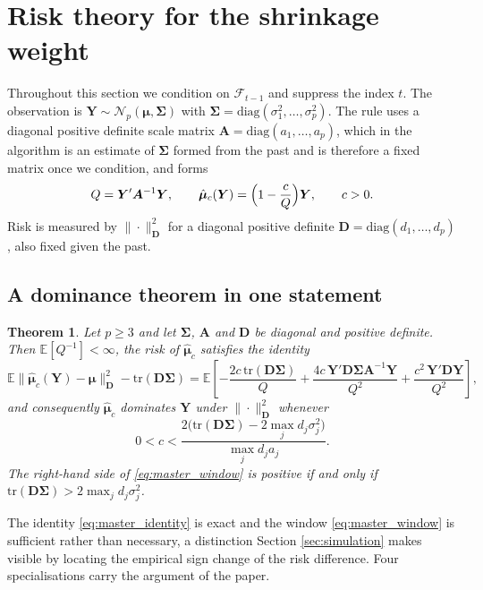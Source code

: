 \documentclass[pdflatex,sn-mathphys-num]{sn-jnl}%
\theoremstyle{thmstyleone}%
\newtheorem{theorem}{Theorem}%
\theoremstyle{thmstyletwo}%
\theoremstyle{thmstylethree}%
\newcommand{\tr}{\mathrm{tr}}
\newcommand{\diag}{\mathrm{diag}}
\newcommand{\E}{\mathbb{E}}
\begin{document}
\section{Risk theory for the shrinkage weight}
\label{sec:risk}

Throughout this section we condition on $\mathcal F_{t-1}$ and suppress the index $t$. The observation is $\bm Y\sim\mathcal N_p(\bm\mu,\bm\Sigma)$ with $\bm\Sigma=\diag(\sigma^2_1,\dots,\sigma^2_p)$. The rule uses a diagonal positive definite scale matrix $\bm A=\diag(a_1,\dots,a_p)$, which in the algorithm is an estimate of $\bm\Sigma$ formed from the past and is therefore a fixed matrix once we condition, and forms
\begin{equation}
\label{eq:Q_and_delta}
Q=\bm Y'\bm A^{-1}\bm Y,
\qquad
\hat{\bm\mu}_c(\bm Y)=\Bigl(1-\frac{c}{Q}\Bigr)\bm Y ,
\qquad c>0 .
\end{equation}
Risk is measured by $\|\cdot\|^2_{\bm D}$ for a diagonal positive definite $\bm D=\diag(d_1,\dots,d_p)$, also fixed given the past.

\subsection{A dominance theorem in one statement}

\begin{theorem}
\label{thm:master}
Let $p\ge3$ and let $\bm\Sigma$, $\bm A$ and $\bm D$ be diagonal and positive definite. Then $\E[Q^{-1}]<\infty$, the risk of $\hat{\bm\mu}_c$ satisfies the identity
\begin{equation}
\label{eq:master_identity}
\E\bigl\|\hat{\bm\mu}_c(\bm Y)-\bm\mu\bigr\|^2_{\bm D}
-\tr(\bm D\bm\Sigma)
=
\E\left[
-\frac{2c\,\tr(\bm D\bm\Sigma)}{Q}
+\frac{4c\,\bm Y'\bm D\bm\Sigma\bm A^{-1}\bm Y}{Q^{2}}
+\frac{c^{2}\,\bm Y'\bm D\bm Y}{Q^{2}}
\right],
\end{equation}
and consequently $\hat{\bm\mu}_c$ dominates $\bm Y$ under $\|\cdot\|^2_{\bm D}$ whenever
\begin{equation}
\label{eq:master_window}
0<c<\frac{2\bigl(\tr(\bm D\bm\Sigma)-2\max_{j}d_j\sigma^2_j\bigr)}{\max_{j}d_ja_j} .
\end{equation}
The right-hand side of \eqref{eq:master_window} is positive if and only if $\tr(\bm D\bm\Sigma)>2\max_{j}d_j\sigma^2_j$.
\end{theorem}

The identity \eqref{eq:master_identity} is exact and the window \eqref{eq:master_window} is sufficient rather than necessary, a distinction Section \ref{sec:simulation} makes visible by locating the empirical sign change of the risk difference. Four specialisations carry the argument of the paper.
\end{document}
